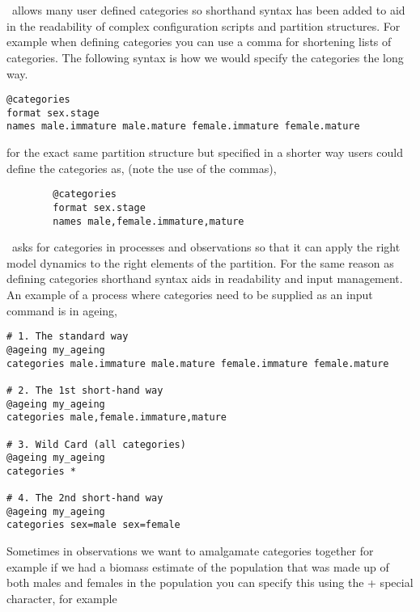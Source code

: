 \section{\label{sec:ShorthandSyntax-section}}
\subsection{\label{sub:categories}}
\CNAME\ allows many user defined categories so shorthand syntax has been added to aid in the readability of complex configuration scripts and partition structures. For example when defining categories you can use a comma for shortening lists of categories. The following syntax is how we would specify the categories the long way.
{\small{\begin{verbatim}
@categories 
format sex.stage
names male.immature male.mature female.immature female.mature		
\end{verbatim}}}	

for the exact same partition structure but specified in a shorter way users could define the categories as, (note the use of the commas),

{\small{\begin{verbatim}
		@categories 
		format sex.stage
		names male,female.immature,mature	
		\end{verbatim}}}

\CNAME\ asks for categories in processes and observations so that it can apply the right model dynamics to the right elements of the partition. For the same reason as defining categories shorthand syntax aids in readability and input management. An example of a process where categories need to be supplied as an input command is in ageing,

{\small{\begin{verbatim}
# 1. The standard way
@ageing my_ageing
categories male.immature male.mature female.immature female.mature

# 2. The 1st short-hand way
@ageing my_ageing
categories male,female.immature,mature

# 3. Wild Card (all categories)
@ageing my_ageing
categories *

# 4. The 2nd short-hand way
@ageing my_ageing
categories sex=male sex=female
\end{verbatim}}}

Sometimes in observations we want to amalgamate categories together for example if we had a biomass estimate of the population that was made up of both males and females in the population you can specify this using the + special character, for example

